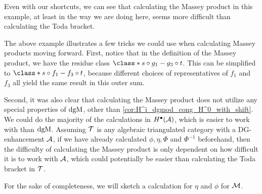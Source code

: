 Even with our shortcuts, we can see that calculating the Massey product in this example, at least in the way we are doing here, seems more difficult than calculating the Toda bracket.

The above example illustrates a few tricks we could use when calculating Massey products moving forward. First, notice that in the definition of the Massey product, we have the residue class \( \class*{ s \circ g_1 - g_3 \circ t} \). This can be simplified to \( \class*{s \circ f_1 - f_3 \circ t} \), because different choices of representatives of \( f_1 \) and \( f_3 \) all yield the same result in this outer sum.

Second, it was also clear that calculating the Massey product does not utilize any special properties of \( \operatorname{dgM} \), other than \autoref{cor:H^i_dgmod_cong_H^0_with_shift}. We could do the majority of the calculations in \( H^{\bullet}({\mathcal{A}}) \), which is easier to work with than \( \operatorname{dgM} \). Assuming \( {\mathcal{T}} \) is any algebraic triangulated category with a DG-enhancement \( {\mathcal{A}} \), if we have already calculated \( \phi, \eta, \Phi \) and \( \Phi^{-1} \) beforehand, then the difficulty of calculating the Massey product is only dependent on how difficult it is to work with \( {\mathcal{A}} \), which could potentially be easier than calculating the Toda bracket in \( {\mathcal{T}} \).

For the sake of completeness, we will sketch a calculation for \( \eta \) and \( \phi \) for \( {\mathcal{M}} \).

